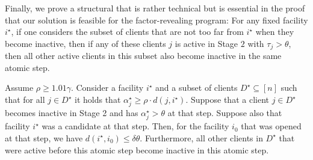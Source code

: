 Finally, we prove a structural that is rather technical but is essential in the proof that our solution is feasible for the factor-revealing program:
For any fixed facility $i^\star$, if one considers the subset of clients that are not too far from $i^\star$ when they become inactive, then if any of these clients $j$ is active in Stage $2$ with $\tau_j > \theta$, then all other active clients in this subset also become inactive in the same atomic step.

\begin{lemma}
    \label{lem:freezing}
    Assume $\rho \geq 1.01 \gamma$.
    Consider a facility $i^\star$ and a subset of clients $D^\star \subseteq [n]$ such that for all $j \in D^\star$ it holds that $\alpha_j^\star \geq \rho \cdot d(j, i^\star)$.
    Suppose that a client $j \in D^\star$ becomes inactive in Stage 2 and has $\alpha_j^\star > \theta$ at that step.
    Suppose also that facility $i^\star$ was a candidate at that step.
    Then, for the facility $i_0$ that was opened at that step, we have $d(i^\star, i_0) \leq \delta \theta$.
    Furthermore, all other clients in $D^\star$ that were active before this atomic step become inactive in this atomic step.
\end{lemma}
